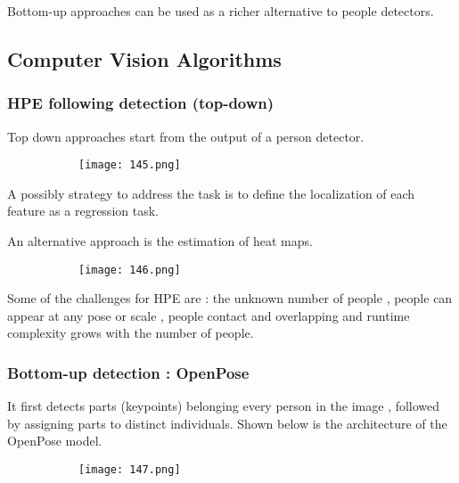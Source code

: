 \documentclass{article}
\begin{document}
Bottom-up approaches can be used as a richer alternative to people detectors.


\subsection{Computer Vision Algorithms}

\subsubsection{HPE following detection (top-down)}

Top down approaches start from the output of a person detector.

\begin{figure}[ht!]
  \centering
  \begin{subfigure}[b]{0.5\linewidth}
    \texttt{[image: 145.png]}
  \end{subfigure}
\end{figure}

A possibly strategy to address the task is to define the localization of each feature as a regression task.

An alternative approach is the estimation of heat maps.

\begin{figure}[ht!]
  \centering
  \begin{subfigure}[b]{0.4\linewidth}
    \texttt{[image: 146.png]}
  \end{subfigure}
\end{figure}

Some of the challenges for HPE are : the unknown number of people , people can appear at any pose or scale , people contact and overlapping and runtime complexity grows with the number of people.

\subsubsection{Bottom-up detection : OpenPose}

It first detects parts (keypoints) belonging every person in the image , followed by assigning parts to distinct individuals. Shown below is the architecture of the OpenPose model.

\begin{figure}[ht!]
  \centering
  \begin{subfigure}[b]{0.7\linewidth}
    \texttt{[image: 147.png]}
  \end{subfigure}
\end{figure}
\end{document}
